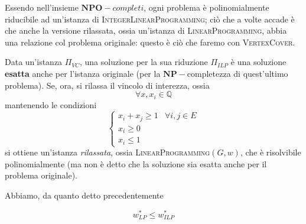 Essendo nell'insieme $\mathbf{NPO}-completi$, ogni problema è polinomialmente riducibile
ad un'istanza di \textsc{IntegerLinearProgramming}; ciò che a volte accade è
che anche la versione rilassata, ossia un'istanza di \textsc{LinearProgramming},
abbia una relazione col problema originale: questo è ciò che faremo con
\textsc{VertexCover}.

Data un'istanza $\Pi_{VC}$, una soluzione per la sua riduzione $\Pi_{ILP}$ è
una soluzione \textbf{esatta} anche per l'istanza originale (per la $\mathbf{NP}-$completezza
di quest'ultimo problema).
Se, ora, si rilassa il vincolo di interezza, ossia
$$
	\forall x, x_i \in \mathbb{Q}
$$
mantenendo le condizioni
$$
	\begin{cases}
		x_i + x_j \geq 1 & \forall i, j \in E \\
		x_i \geq 0                            \\
		x_i \leq 1
	\end{cases}
$$
si ottiene  un'istanza \textit{rilassata}, ossia \textsc{LinearProgramming}$(G,w)$,
che è risolvibile polinomialmente (ma non è detto che la soluzione sia
esatta anche per il problema originale).

Abbiamo, da quanto detto precedentemente
\begin{lemma}\label{lem:lp_leq_ilp}
	$$
		w^*_{LP} \leq w^*_{ILP}
	$$
\end{lemma}

